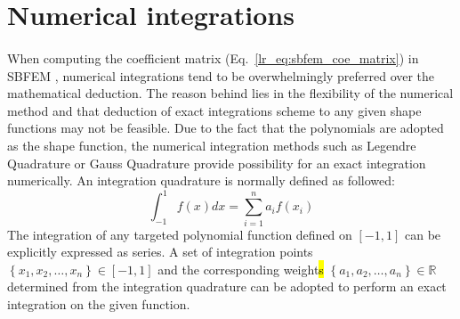\section{Numerical integrations}
\label{iso_section:numerical_integration}
\paragraph{}
When computing the coefficient matrix (Eq.~\ref{lr_eq:sbfem_coe_matrix}) in SBFEM , numerical integrations tend to be overwhelmingly preferred over the mathematical deduction.
The reason behind lies in the flexibility of the numerical method and that deduction of exact integrations scheme to any given shape functions may not be feasible. 
Due to the fact that the polynomials are adopted as the shape function, the numerical integration methods such as Legendre Quadrature or Gauss Quadrature provide possibility for an exact integration numerically.
An integration quadrature is normally defined as followed:
    \begin{equation}
        \int_{-1}^{1}
        f(x)dx 
        = \sum_{i=1}^n
        a_i f(x_i)
    \label{iso_eq:numerical_integration}
    \end{equation}
%
The integration of any targeted polynomial function defined on $[-1,1]$ can be explicitly expressed as series.
A set of integration points $\left\{ x_1, x_2, \dots, x_n \right\} \in \left[-1,1\right]$ and the corresponding weight\hl{s} $\left\{ a_1, a_2, \dots, a_n \right\} \in \mathbb{R}$ determined from the integration quadrature can be adopted to perform an exact integration on the given function.
